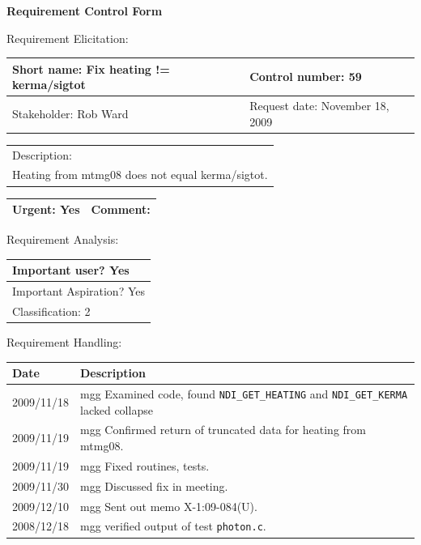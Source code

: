 \begin{center}\Large\bf
Requirement Control Form
\end{center}
\vspace{24pt}

Requirement Elicitation:

\begin{tabular}{|p{211pt}|p{211pt}|} \hline
Short name: Fix heating != kerma/sigtot & Control number: 59\\ \hline
Stakeholder: Rob Ward & Request date: November 18, 2009\\
\end{tabular}
\begin{tabular}{|p{433pt}|} \hline
Description: \\ 
Heating from mtmg08 does not equal kerma/sigtot.
\\ \hline
\end{tabular} 
\begin{tabular}{|p{211pt}|p{211pt}|} \hline
Urgent: Yes & Comment: 
\\ \hline
\end{tabular}

\vspace{24pt}

Requirement Analysis:

\begin{tabular}{|p{433pt}|} \hline
Important user? Yes \\ \hline
Important Aspiration? Yes \\ \hline
Classification: 2 \\ \hline
\end{tabular}
\vspace{24pt}

Requirement Handling:

\begin{tabular}{|p{72pt}|p{351pt}|} \hline
Date & Description \\ \hline
2009/11/18 & mgg Examined code, found \texttt{NDI\_GET\_HEATING} and
\texttt{NDI\_GET\_KERMA} lacked collapse \\ \hline
2009/11/19 & mgg Confirmed return of truncated data for heating from
mtmg08. \\ \hline 
2009/11/19 & mgg Fixed routines, tests. \\ \hline
2009/11/30 & mgg Discussed fix in meeting. \\ \hline
2009/12/10 & mgg Sent out memo X-1:09-084(U). \\ \hline 
2008/12/18 & mgg verified output of test \texttt{photon.c}. \\ \hline
\end{tabular}

